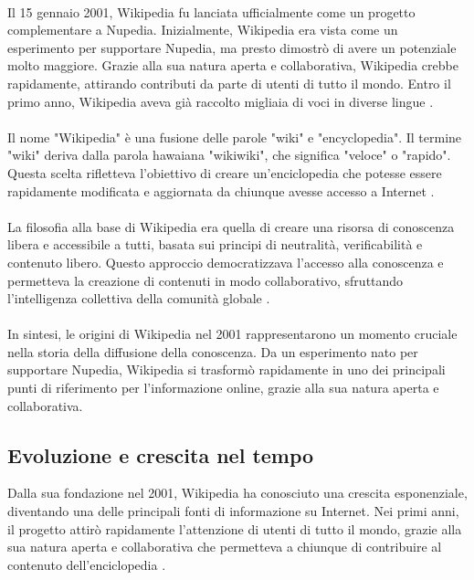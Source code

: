 \documentclass[12pt,a4paper]{report}
\begin{document}
\paragraph*{}
Il 15 gennaio 2001, Wikipedia fu lanciata ufficialmente come un progetto complementare a Nupedia. Inizialmente, Wikipedia era vista come un esperimento per supportare Nupedia, ma presto dimostrò di avere un potenziale molto maggiore. Grazie alla sua natura aperta e collaborativa, Wikipedia crebbe rapidamente, attirando contributi da parte di utenti di tutto il mondo. Entro il primo anno, Wikipedia aveva già raccolto migliaia di voci in diverse lingue \cite{jemielniak2014wikipedia}.
\paragraph*{}
Il nome "Wikipedia" è una fusione delle parole "wiki" e "encyclopedia". Il termine "wiki" deriva dalla parola hawaiana "wikiwiki", che significa "veloce" o "rapido". Questa scelta rifletteva l'obiettivo di creare un'enciclopedia che potesse essere rapidamente modificata e aggiornata da chiunque avesse accesso a Internet \cite{cunningham2001wiki}.
\paragraph*{}
La filosofia alla base di Wikipedia era quella di creare una risorsa di conoscenza libera e accessibile a tutti, basata sui principi di neutralità, verificabilità e contenuto libero. Questo approccio democratizzava l'accesso alla conoscenza e permetteva la creazione di contenuti in modo collaborativo, sfruttando l'intelligenza collettiva della comunità globale \cite{denning2005wikipedia}.
\paragraph*{}
In sintesi, le origini di Wikipedia nel 2001 rappresentarono un momento cruciale nella storia della diffusione della conoscenza. Da un esperimento nato per supportare Nupedia, Wikipedia si trasformò rapidamente in uno dei principali punti di riferimento per l'informazione online, grazie alla sua natura aperta e collaborativa.

\subsection{Evoluzione e crescita nel tempo}

Dalla sua fondazione nel 2001, Wikipedia ha conosciuto una crescita esponenziale, diventando una delle principali fonti di informazione su Internet. Nei primi anni, il progetto attirò rapidamente l'attenzione di utenti di tutto il mondo, grazie alla sua natura aperta e collaborativa che permetteva a chiunque di contribuire al contenuto dell'enciclopedia \cite{lih2009wikipedia}.
\end{document}
